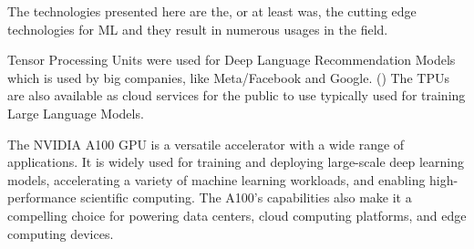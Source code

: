 The technologies presented here are the, or at least was, the cutting edge technologies for ML and
they result in numerous usages in the field. 

Tensor Processing Units were used for Deep Language Recommendation Models which is used by big companies, like Meta/Facebook and Google. ()
The TPUs are also available as cloud services for the public to use typically used for training Large Language Models.

The NVIDIA A100 GPU is a versatile accelerator with a wide range of applications. It is widely used for training and deploying large-scale deep learning models, accelerating a variety of machine learning workloads, and enabling high-performance scientific computing. The A100's capabilities also
 make it a compelling choice for powering data centers, cloud computing platforms, and edge computing devices.